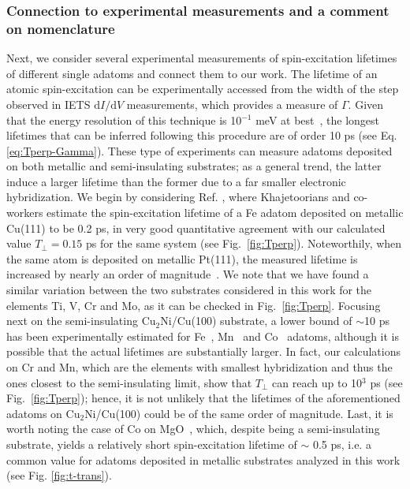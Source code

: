 \documentclass[prb,footinbib,showpacs,twocolumn,amsmath,amssymb]{revtex4}
\begin{document}
\subsubsection{Connection to experimental measurements and 
a comment on nomenclature}
\label{subsubsec:long}


Next, we consider several experimental measurements of 
spin-excitation lifetimes of different single adatoms and 
connect them to our work.
The lifetime of an atomic spin-excitation can be experimentally accessed  
from the width of the step observed in IETS $\text{d}I/\text{d}V$ measurements, which
provides a measure of $\Gamma$. 
Given that the energy resolution of this technique is 10$^{-1}$ meV at best~\cite{PhysRevLett.111.157204},
the longest lifetimes that can be inferred following this procedure
are of order 10 ps (see Eq. \ref{eq:Tperp-Gamma}).  
These type of experiments can measure adatoms deposited on both 
metallic and semi-insulating substrates;
as a general trend, the latter induce a larger lifetime than the former 
due to a far smaller electronic hybridization.
We  begin by considering Ref. , where 
Khajetoorians and co-workers estimate the spin-excitation lifetime  
of a Fe adatom deposited on metallic Cu(111) to be 
0.2 ps, in very good quantitative 
agreement with our calculated value $T_{\perp}=0.15$ ps for the same system
(see  Fig.~\ref{fig:Tperp}).
Noteworthily, when the same atom is deposited on metallic Pt(111), 
the measured lifetime  is increased by
nearly an order of magnitude~\cite{PhysRevLett.111.157204}.
We note that we have found a similar variation 
between the two substrates  considered in this work
for the elements Ti, V, Cr and Mo, as it can be checked in Fig.~\ref{fig:Tperp}. 
Focusing next on the semi-insulating $\text{Cu}_{2}$Ni/Cu(100) substrate,
a lower bound of  $\sim$10 ps has been experimentally estimated for
Fe~\cite{hirjibehedin_large_2007,loth_njp}, Mn~\cite{loth_njp} and Co~\cite{otte_role_2008}
adatoms, although it is possible that the actual lifetimes are substantially larger.
In fact, our calculations on Cr and Mn, which are the elements with smallest hybridization
and thus the ones closest to the semi-insulating limit, show that  $T_{\perp}$ can reach up to
10$^{3}$ ps (see Fig.~\ref{fig:Tperp});
hence, it is not unlikely that the lifetimes of the aforementioned  
adatoms on $\text{Cu}_{2}$Ni/Cu(100) could be of the same order of magnitude.
Last, it is worth noting the case of Co on MgO~\cite{rau_reaching_2014},
which, despite being a semi-insulating substrate, yields a relatively short 
spin-excitation lifetime of $\sim$ 0.5 ps, i.e. a common value for
adatoms deposited in metallic substrates analyzed in this work (see Fig. \ref{fig:t-trans}). 
\end{document}
